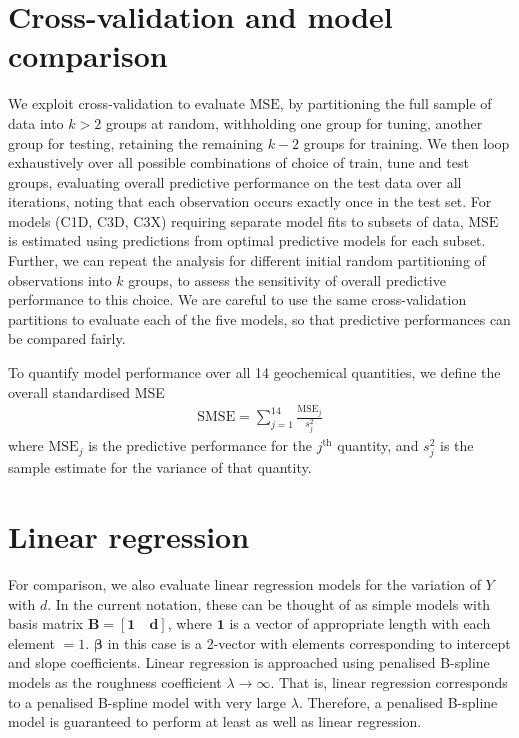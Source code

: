 \documentclass[a4paper,10pt]{article}
\newcommand {\un}[1]{\boldsymbol{#1}}
\begin{document}
\section*{Cross-validation and model comparison}
%
We exploit cross-validation to evaluate $\text{MSE}$, by partitioning the full sample of data into $k>2$ groups at random, withholding one group for tuning, another group for testing, retaining the remaining $k-2$ groups for training. We then loop exhaustively over all possible combinations of choice of train, tune and test groups, evaluating overall predictive performance on the test data over all iterations, noting that each observation occurs exactly once in the test set. For models (C1D, C3D, C3X) requiring separate model fits to subsets of data, $\text{MSE}$ is estimated using predictions from optimal predictive models for each subset. Further, we can repeat the analysis for different initial random partitioning of observations into $k$ groups, to assess the sensitivity of overall predictive performance to this choice. We are careful to use the same cross-validation partitions to evaluate each of the five models, so that predictive performances can be compared fairly.

To quantify model performance over all 14 geochemical quantities, we define the overall standardised MSE
%
\begin{eqnarray*}
	\text{SMSE} = \sum_{j=1}^{14} \frac{\text{MSE}_j}{s_j^2}
\end{eqnarray*}
%
where $\text{MSE}_j$ is the predictive performance for the $j^{\text{th}}$ quantity, and $s_j^2$ is the sample estimate for the variance of that quantity.

\section*{Linear regression}
%
For comparison, we also evaluate linear regression models for the variation of $Y$ with $d$. In the current notation, these can be thought of as simple models with basis matrix $\un{B}=[\un{1} \quad \un{d}]$, where $\un{1}$ is a vector of appropriate length with each element $=1$. $\un{\beta}$ in this case is a 2-vector with elements corresponding to intercept and slope coefficients. Linear regression is approached using penalised B-spline models as the roughness coefficient $\lambda \rightarrow \infty$. That is, linear regression corresponds to a penalised B-spline model with very large $\lambda$. Therefore, a penalised B-spline model is guaranteed to perform at least as well as linear regression.




\end{document}
